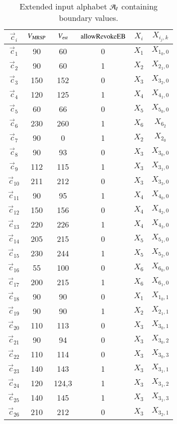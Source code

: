 \begin{table}[htdp]
\caption{Extended input alphabet ${{\cal A}}_I$ containing boundary values.}
\begin{center}
\scriptsize
\begin{tabular}{|c||c|c|c||c|c|}
\hline\hline
$\vec c_i$&${V_{\text{\sl MRSP}}}$&${V_{\text{\sl est}}}$&$\text{allowRevokeEB}$&$X_i$ & $X_{i_j,k}$ \\\hline\hline
$\vec c_1$&90&60&0&$X_1$&$X_{1_0,0}$ \\
$\vec c_2$&90&60&1&$ X_2$ &$X_{2_1,0}$ \\
$\vec c_3$&150&152&0&$X_3$ &$X_{3_2,0}$ \\
$\vec c_4$&120&125&1&$X_4$&$X_{4_1,0}$ \\
$\vec c_{5}$&60&66&0&$X_5$&$X_{5_0,0}$ \\
$\vec c_{6}$&230&260&1&$X_6$&$X_{6_2}$\\\hline
% 
$\vec c_{7}$&90&0&1& $ X_2$  &$X_{2_0}$ \\
%
$\vec c_{8}$&90&93&0&$X_3$ &$X_{3_0,0}$ \\
$\vec c_{9}$&112&115&1&$X_3$&$X_{3_1,0}$ \\
$\vec c_{10}$&211&212&0&$X_3$ &$X_{3_3,0}$ \\
%
$\vec c_{11}$&90&95&1&$X_4$&$X_{4_0,0}$ \\
$\vec c_{12}$&150&156&0&$X_4$&$X_{4_2,0}$ \\
$\vec c_{13}$&220&226&1&$X_4$&$X_{4_3,0}$ \\
%
$\vec c_{14}$&205&215&0&$X_5$&$X_{5_1,0}$ \\
$\vec c_{15}$&230&244&1&$X_5$&$X_{5_2,0}$ \\
%
$\vec c_{16}$&55&100&0&$X_6$&$X_{6_0,0}$ \\
$\vec c_{17}$&200&215&1&$X_6$&$X_{6_1,0}$ 
\\\hline\hline
$\vec c_{18}$&90&90&0&$X_1$&$X_{1_0,1}$ \\
$\vec c_{19}$&90&90&1&$ X_2$ &$X_{2_1,1}$ \\
$\vec c_{20}$&110&113&0&$X_3$ &$X_{3_0,1}$ \\
$\vec c_{21}$&90&94&0&$X_3$ &$X_{3_0,2}$ \\
$\vec c_{22}$&110&114&0&$X_3$ &$X_{3_0,3}$ \\
$\vec c_{23}$&140&143&1&$X_3$&$X_{3_1,1}$ \\
$\vec c_{24}$&120&124,3&1&$X_3$&$X_{3_1,2}$ \\
$\vec c_{25}$&140&145&1&$X_3$&$X_{3_1,3}$ \\
$\vec c_{26}$&210&212&0&$X_3$ &$X_{3_2,1}$ \\

\end{tabular}
\end{center}
\end{table}
